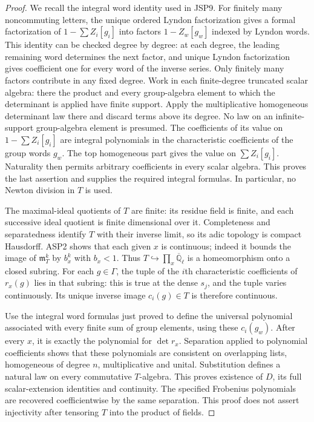 \begin{proof}
We recall the integral word identity used in JSP9.  For finitely
many noncommuting letters, the unique ordered Lyndon factorization
gives a formal factorization of \(1-\sum Z_i[g_i]\) into
factors \(1-Z_w[g_w]\) indexed by Lyndon words.  This identity
can be checked degree by degree: at each degree, the leading
remaining word determines the next factor, and unique Lyndon
factorization gives coefficient one for every word of the inverse
series.  Only finitely many factors contribute in any fixed
degree.  Work in each finite-degree truncated scalar algebra:
there the product and every group-algebra element to which the
determinant is applied have finite support.  Apply the
multiplicative homogeneous determinant law there and discard
terms above its degree.  No law on an infinite-support
group-algebra element is presumed.  The coefficients of its value on
\(1-\sum Z_i[g_i]\) are integral polynomials in the
characteristic coefficients of the group words \(g_w\).
The top homogeneous part gives the value on
\(\sum Z_i[g_i]\).  Naturality then permits arbitrary
coefficients in every scalar algebra.  This proves the last
assertion and supplies the required integral formulas.  In
particular, no Newton division in \(T\) is used.

The maximal-ideal quotients of \(T\) are finite: its residue
field is finite, and each successive ideal quotient is finite
dimensional over it.  Completeness and separatedness identify
\(T\) with their inverse limit, so its adic topology is compact
Hausdorff.  ASP2 shows that each given \(x\) is continuous;
indeed it bounds the image of \(\mathfrak m_T^k\) by
\(b_x^k\) with \(b_x<1\).  Thus
\(T\hookrightarrow\prod_x\overline{\mathbb Q}_\ell\)
is a homeomorphism onto a closed subring.
For each \(g\in\Gamma\), the tuple of the \(i\)th
characteristic coefficients of \(r_x(g)\) lies in that subring:
this is true at the dense \(s_j\), and the tuple varies
continuously.  Its unique inverse image \(c_i(g)\in T\)
is therefore continuous.

Use the integral word formulas just proved to define the universal
polynomial associated with every finite sum of group elements,
using these \(c_i(g_w)\).  After every \(x\), it is exactly
the polynomial for \(\det r_x\).  Separation applied to
polynomial coefficients shows that these polynomials are
consistent on overlapping lists, homogeneous of degree \(n\),
multiplicative and unital.  Substitution defines a natural law
on every commutative \(T\)-algebra.  This proves existence of
\(D\), its full scalar-extension identities and continuity.
The specified Frobenius polynomials are recovered coefficientwise
by the same separation.  This proof does not assert injectivity
after tensoring \(T\) into the product of fields.
\end{proof}

